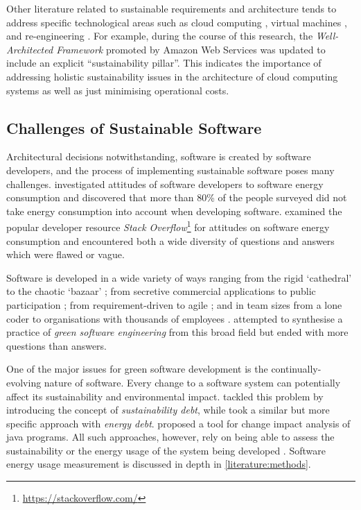 Other literature related to sustainable requirements and architecture tends to address specific technological areas such as cloud computing \citep{Khomh2018} \citep{Chen2012}, virtual machines \citep{Marcu2011}, and re-engineering \citep{Jelschen2012}. For example, during the course of this research, the \emph{Well-Architected Framework} \citep{AmazonWellArchitected} promoted by Amazon Web Services was updated to include an explicit \enquote{sustainability pillar}. This indicates the importance of addressing holistic sustainability issues in the architecture of cloud computing systems as well as just minimising operational costs.

\subsection{Challenges of Sustainable Software}
\label{literature:challenges}

Architectural decisions notwithstanding, software is created by software developers, and the process of implementing sustainable software poses many challenges. \citet{Pang2016} investigated attitudes of software developers to software energy consumption and discovered that more than 80\% of the people surveyed did not take energy consumption into account when developing software. \citet{Pinto2014} examined the popular developer resource \emph{Stack Overflow}\footnote{\url{https://stackoverflow.com/}} for attitudes on software energy consumption and encountered both a wide diversity of questions and answers which were flawed or vague.

Software is developed in a wide variety of ways ranging from the rigid `cathedral' to the chaotic `bazaar' \citep{Raymond1999}; from secretive commercial applications to public participation \citep{Ballhausen2019}; from requirement-driven to agile \citep{Dick2013}; and in team sizes from a lone coder to organisations with thousands of employees \citep{Sawyer2004}. \citet{Naumann2015} attempted to synthesise a practice of \emph{green software engineering} from this broad field but ended with more questions than answers.

One of the major issues for green software development is the continually-evolving nature of software. Every change to a software system can potentially affect its sustainability and environmental impact. \citet{Betz2015} tackled this problem by introducing the concept of \emph{sustainability debt}, while \citet{Couto2020} took a similar but more specific approach with \emph{energy debt}. \citet{Ren2004} proposed a tool for change impact analysis of java programs. All such approaches, however, rely on being able to assess the sustainability or the energy usage of the system being developed \citep{Jagroep2016}. Software energy usage measurement is discussed in depth in \autoref{literature:methods}.


